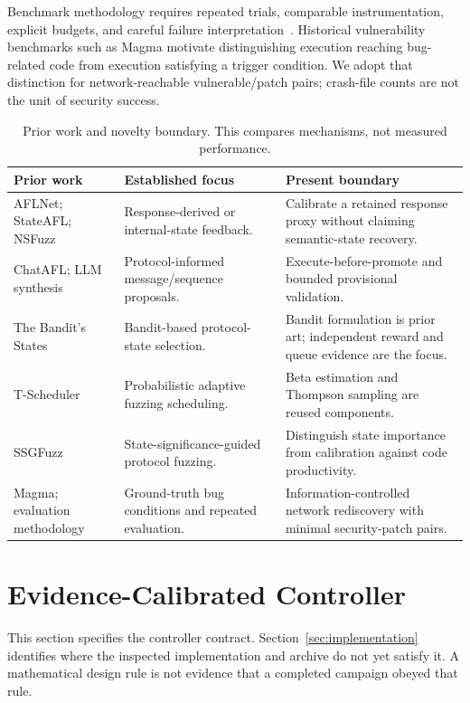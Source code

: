 \documentclass[final,5p,times,number]{elsarticle}
\begin{document}
Benchmark methodology requires repeated trials, comparable instrumentation, explicit budgets, and careful failure interpretation~\cite{profuzzbench_benchmark_stateful_protocol_2021,sok_prudent_evaluation_practices_2024,reliability_benchmarking_2022}. Historical vulnerability benchmarks such as Magma motivate distinguishing execution reaching bug-related code from execution satisfying a trigger condition. We adopt that distinction for network-reachable vulnerable/patch pairs; crash-file counts are not the unit of security success.

\begin{table}[t]
\centering\small
\caption{Prior work and novelty boundary. This compares mechanisms, not measured performance.}
\label{tab:novelty}
\begin{tabularx}{\textwidth}{l Y Y}
\toprule
Prior work & Established focus & Present boundary \\
\midrule
AFLNet; StateAFL; NSFuzz & Response-derived or internal-state feedback. & Calibrate a retained response proxy without claiming semantic-state recovery. \\
ChatAFL; LLM synthesis & Protocol-informed message/sequence proposals. & Execute-before-promote and bounded provisional validation. \\
The Bandit's States & Bandit-based protocol-state selection. & Bandit formulation is prior art; independent reward and queue evidence are the focus. \\
T-Scheduler & Probabilistic adaptive fuzzing scheduling. & Beta estimation and Thompson sampling are reused components. \\
SSGFuzz & State-significance-guided protocol fuzzing. & Distinguish state importance from calibration against code productivity. \\
Magma; evaluation methodology & Ground-truth bug conditions and repeated evaluation. & Information-controlled network rediscovery with minimal security-patch pairs. \\
\bottomrule
\end{tabularx}
\end{table}

\section{Evidence-Calibrated Controller}
\label{sec:design}
This section specifies the controller contract. Section~\ref{sec:implementation} identifies where the inspected implementation and archive do not yet satisfy it. A mathematical design rule is not evidence that a completed campaign obeyed that rule.
\end{document}
